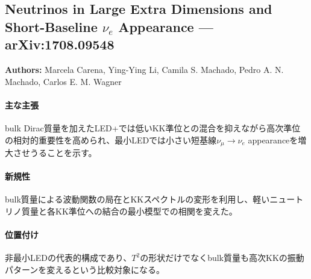 \subsection{Neutrinos in Large Extra Dimensions and Short-Baseline $\nu_e$ Appearance --- arXiv:1708.09548}

\textbf{Authors:} Marcela Carena, Ying-Ying Li, Camila S. Machado, Pedro A. N. Machado, Carlos E. M. Wagner

\paragraph{主な主張}
bulk Dirac質量を加えたLED+では低いKK準位との混合を抑えながら高次準位の相対的重要性を高められ、最小LEDでは小さい短基線$\nu_\mu\to\nu_e$ appearanceを増大させうることを示す\cite{Carena:2017LEDplus}。

\paragraph{新規性}
bulk質量による波動関数の局在とKKスペクトルの変形を利用し、軽いニュートリノ質量と各KK準位への結合の最小模型での相関を変えた。

\paragraph{位置付け}
非最小LEDの代表的構成であり、$T^2$の形状だけでなくbulk質量も高次KKの振動パターンを変えるという比較対象になる。
